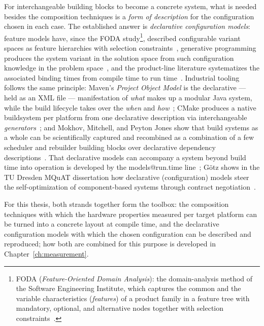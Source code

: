 \begin{nurlang}
For interchangeable building blocks to become a concrete system, what is needed besides the
composition techniques is a \emph{form of description} for the configuration chosen in each case.
The established answer is \emph{declarative configuration models}: feature models have, since the
FODA study\footnote{FODA (\emph{Feature-Oriented Domain Analysis}): the domain-analysis method of the
Software Engineering Institute, which captures the common and the variable characteristics
(\emph{features}) of a product family in a feature tree with mandatory, optional, and alternative nodes
together with selection constraints~\cite{kang1990foda}.}, described configurable variant spaces as
feature hierarchies with selection constraints~\cite{kang1990foda}, generative programming produces the system variant in the solution
space from such configuration knowledge in the problem space~\cite{czarnecki2000generative}, and
the product-line literature systematizes the associated binding times from compile time to run
time~\cite{apel2013feature}. Industrial tooling follows the same principle: Maven's \emph{Project
Object Model} is the declarative --- held as an XML file --- manifestation of \emph{what} makes up
a modular Java system, while the build lifecycle takes over the \emph{when} and
\emph{how}~\cite{maven_pom}; CMake produces a native buildsystem per platform from one declarative
description via interchangeable \emph{generators}~\cite{cmake_manual}; and Mokhov, Mitchell, and
Peyton Jones show that build systems as a whole can be scientifically captured and recombined as a
combination of a few scheduler and rebuilder building blocks over declarative dependency
descriptions~\cite{mokhov2018build}. That declarative models can accompany a system beyond build
time into operation is developed by the models@run.time line~\cite{blair2009modelsruntime}; Götz
shows in the TU Dresden MQuAT dissertation how declarative (configuration) models steer the
self-optimization of component-based systems through contract negotiation~\cite{goetz2013mqat}.

For this thesis, both strands together form the toolbox: the composition techniques with which the
hardware properties measured per target platform can be turned into a concrete layout at compile
time, and the declarative configuration models with which the chosen configuration can be described
and reproduced; how both are combined for this purpose is developed in
Chapter~\ref{ch:measurement}.
\end{nurlang}
